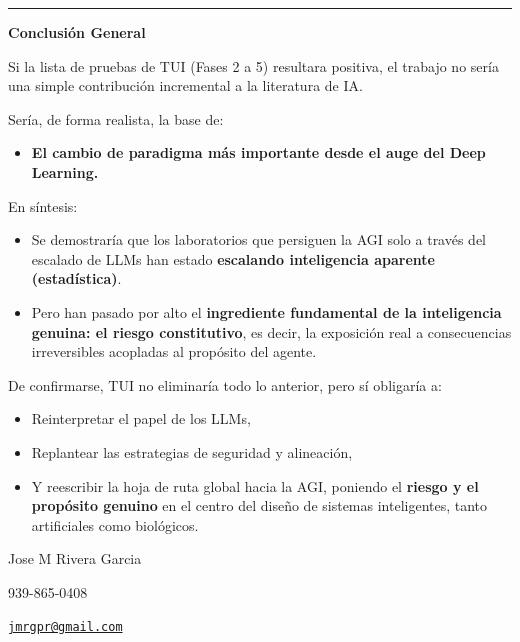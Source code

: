 \begin{center}\rule{0.5\linewidth}{0.5pt}\end{center}

\textbf{Conclusión General}

Si la lista de pruebas de TUI (Fases 2 a 5) resultara positiva, el
trabajo no sería una simple contribución incremental a la literatura de
IA.

Sería, de forma realista, la base de:

\begin{itemize}
\item
  \textbf{El cambio de paradigma más importante desde el auge del Deep
  Learning.}
\end{itemize}

En síntesis:

\begin{itemize}
\item
  Se demostraría que los laboratorios que persiguen la AGI solo a través
  del escalado de LLMs han estado \textbf{escalando inteligencia
  aparente (estadística)}.
\item
  Pero han pasado por alto el \textbf{ingrediente fundamental de la
  inteligencia genuina: el riesgo constitutivo}, es decir, la exposición
  real a consecuencias irreversibles acopladas al propósito del agente.
\end{itemize}

De confirmarse, TUI no eliminaría todo lo anterior, pero sí obligaría a:

\begin{itemize}
\item
  Reinterpretar el papel de los LLMs,
\item
  Replantear las estrategias de seguridad y alineación,
\item
  Y reescribir la hoja de ruta global hacia la AGI, poniendo el
  \textbf{riesgo y el propósito genuino} en el centro del diseño de
  sistemas inteligentes, tanto artificiales como biológicos.
\end{itemize}

Jose M Rivera Garcia

939-865-0408

\href{mailto:jmrgpr@gmail.com}{\nolinkurl{jmrgpr@gmail.com}}
